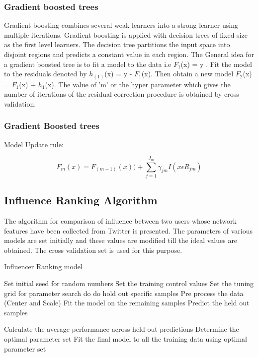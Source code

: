 \documentclass[conference]{IEEEtran}
\begin{document}
\subsubsection{Gradient boosted trees}

Gradient boosting combines several weak learners into a strong learner using multiple iterations. Gradient boosting is applied with decision trees of fixed size as the first level learners. The decision tree partitions the input space into disjoint regions and predicts a constant value in each region. The General idea for a gradient boosted tree is to fit a model to the data i.e $F_1$(x) = y . Fit the model to the residuals denoted by $h_(1)$(x) = y - $F_1$(x). Then obtain a new model $F_2$(x) = $F_1$(x) + $h_1$(x). The value of 'm' or the hyper parameter which gives the number of iterations of the residual correction procedure is obtained by cross validation. \\ 





\subsubsection{Gradient Boosted trees}



Model Update rule:

\begin{equation}
F_{m}(x) = F_{(m-1)}(x)) + \sum_{j=1}^{J_m} \gamma_{jm} I (x \epsilon R_{jm}) 
\end{equation}

\subsection{Influence Ranking Algorithm}

The algorithm for comparison of influence between two users whose network features have been collected from Twitter is presented. The parameters of various models are set initially and these values are modified till the ideal values are obtained. The cross validation set is used for this purpose.\\

\begin{algorithm}
\caption{Influencer Ranking model}
\begin{algorithmic}[1]
 \State Set initial seed for random numbers
 \State Set the training control values
 \State Set the tuning grid for parameter search
  do
  do
 \State hold out specific samples
 \State Pre process the data (Center and Scale)
 \State Fit the model on the remaining samples
 \State Predict the held out samples
 
 \EndFor
 \State Calculate the average performance across held out predictions
 \EndFor
 \State Determine the optimal parameter set
 \State Fit the final model to all the training data using optimal parameter set 
 

\end{algorithmic}
\end{algorithm}
\end{document}
